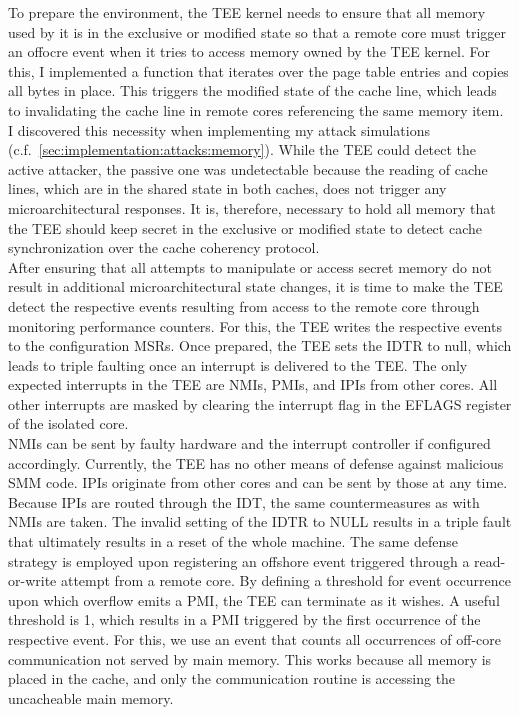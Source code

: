 To prepare the environment, the TEE kernel needs to ensure that all memory used
by it is in the exclusive or modified state so that a remote core must trigger
an offocre event when it
tries to access memory owned by the TEE kernel. For this, I implemented a
function that iterates over the page table entries and copies all bytes in
place. This triggers the modified state of the cache line, which leads to
invalidating the cache line in remote cores referencing the same memory item. I
discovered this necessity when implementing my attack simulations
(c.f.~\ref{sec:implementation:attacks:memory}). While the TEE could detect the
active attacker, the passive one was undetectable because the reading of cache
lines, which are in the shared state in both caches, does not trigger any
microarchitectural responses. It is, therefore, necessary to hold all memory
that the TEE should keep secret in the exclusive or modified state to detect
cache synchronization over the cache coherency protocol.\\

After ensuring that all attempts to manipulate or access secret memory do not
result in additional microarchitectural state changes, it is time to make the
TEE detect the respective events resulting from access to the remote core
through monitoring performance counters. For this, the TEE writes the respective
events to the configuration MSRs. Once prepared, the TEE sets the IDTR to null,
which leads to triple faulting once an interrupt is delivered to the TEE. The
only expected interrupts in the TEE are NMIs, PMIs, and IPIs from other cores.
All other interrupts are masked by clearing the interrupt flag in the EFLAGS
register of the isolated core. \\

NMIs can be sent by faulty hardware and the interrupt controller if configured
accordingly. Currently, the TEE has no other means of defense against malicious
SMM code. IPIs originate from other cores and can be sent by those at any time.
Because IPIs are routed through the IDT, the same countermeasures as with NMIs
are taken. The invalid setting of the IDTR to NULL results in a triple fault
that ultimately results in a reset of the whole machine. The same defense
strategy is employed upon registering an offshore event triggered through a
read-or-write attempt from a remote core. By defining a threshold for event
occurrence upon which overflow emits a PMI, the TEE can terminate as it wishes.
A useful threshold is 1, which results in a PMI triggered by the first
occurrence of the respective event. For this, we use an event that counts all
occurrences of off-core communication not served by main memory. This works
because all memory is placed in the cache, and only the communication routine is
accessing the uncacheable main memory. \\

